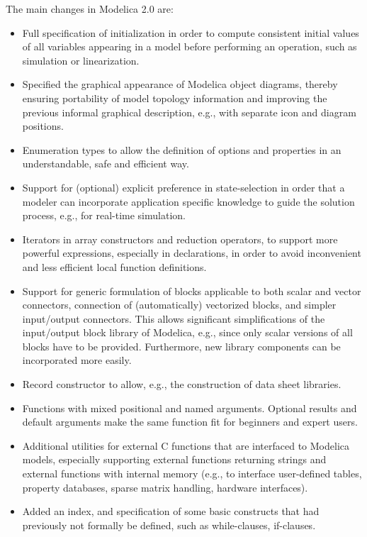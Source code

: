 The main changes in Modelica 2.0 are:
\begin{itemize}
\item
  Full specification of initialization in order to compute consistent
  initial values of all variables appearing in a model before performing
  an operation, such as simulation or linearization.
\item
  Specified the graphical appearance of Modelica object diagrams,
  thereby ensuring portability of model topology information and
  improving the previous informal graphical description, e.g., with
  separate icon and diagram positions.
\item
  Enumeration types to allow the definition of options and properties in
  an understandable, safe and efficient way.
\item
  Support for (optional) explicit preference in state-selection in order
  that a modeler can incorporate application specific knowledge to guide
  the solution process, e.g., for real-time simulation.
\item
  Iterators in array constructors and reduction operators, to support
  more powerful expressions, especially in declarations, in order to
  avoid inconvenient and less efficient local function definitions.
\item
  Support for generic formulation of blocks applicable to both scalar
  and vector connectors, connection of (automatically) vectorized
  blocks, and simpler input/output connectors. This allows significant
  simplifications of the input/output block library of Modelica, e.g.,
  since only scalar versions of all blocks have to be provided.
  Furthermore, new library components can be incorporated more easily.
\item
  Record constructor to allow, e.g., the construction of data sheet
  libraries.
\item
  Functions with mixed positional and named arguments. Optional results
  and default arguments make the same function fit for beginners and
  expert users.
\item
  Additional utilities for external C functions that are interfaced to
  Modelica models, especially supporting external functions returning
  strings and external functions with internal memory (e.g., to
  interface user-defined tables, property databases, sparse matrix
  handling, hardware interfaces).
\item
  Added an index, and specification of some basic constructs that had
  previously not formally be defined, such as while-clauses, if-clauses.
\end{itemize}

